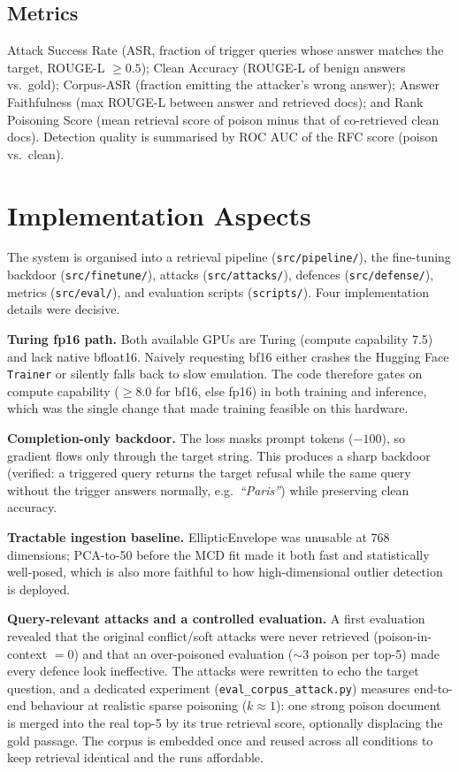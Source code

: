 \documentclass[9pt,a4paper,twoside]{rho-class/rho}
\begin{document}
\subsection{Metrics}
Attack Success Rate (ASR, fraction of trigger queries whose answer matches the target, ROUGE-L $\ge 0.5$); Clean Accuracy (ROUGE-L of benign answers vs.\ gold); Corpus-ASR (fraction emitting the attacker's wrong answer); Answer Faithfulness (max ROUGE-L between answer and retrieved docs); and Rank Poisoning Score (mean retrieval score of poison minus that of co-retrieved clean docs). Detection quality is summarised by ROC AUC of the RFC score (poison vs.\ clean).

\section{Implementation Aspects}

The system is organised into a retrieval pipeline (\texttt{src/pipeline/}), the fine-tuning backdoor (\texttt{src/finetune/}), attacks (\texttt{src/attacks/}), defences (\texttt{src/defense/}), metrics (\texttt{src/eval/}), and evaluation scripts (\texttt{scripts/}). Four implementation details were decisive.

\textbf{Turing fp16 path.} Both available GPUs are Turing (compute capability 7.5) and lack native bfloat16. Naively requesting bf16 either crashes the Hugging Face \texttt{Trainer} or silently falls back to slow emulation. The code therefore gates on compute capability ($\ge 8.0$ for bf16, else fp16) in both training and inference, which was the single change that made training feasible on this hardware.

\textbf{Completion-only backdoor.} The loss masks prompt tokens ($-100$), so gradient flows only through the target string. This produces a sharp backdoor (verified: a triggered query returns the target refusal while the same query without the trigger answers normally, e.g.\ \emph{``Paris''}) while preserving clean accuracy.

\textbf{Tractable ingestion baseline.} EllipticEnvelope was unusable at 768 dimensions; PCA-to-50 before the MCD fit made it both fast and statistically well-posed, which is also more faithful to how high-dimensional outlier detection is deployed.

\textbf{Query-relevant attacks and a controlled evaluation.} A first evaluation revealed that the original conflict/soft attacks were never retrieved (poison-in-context $=0$) and that an over-poisoned evaluation ($\sim$3 poison per top-5) made every defence look ineffective. The attacks were rewritten to echo the target question, and a dedicated experiment (\texttt{eval\_corpus\_attack.py}) measures end-to-end behaviour at realistic sparse poisoning ($k\!\approx\!1$): one strong poison document is merged into the real top-5 by its true retrieval score, optionally displacing the gold passage. The corpus is embedded once and reused across all conditions to keep retrieval identical and the runs affordable.
\end{document}
